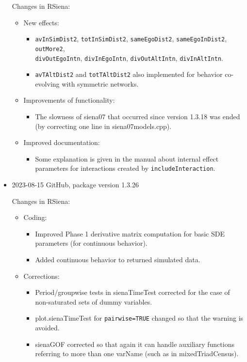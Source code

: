 \documentclass[a4paper,fleqn,11pt]{article}
\newcommand{\+}{\, + \,}
\newcommand{\sfn}[1]{\textsf{#1}}
\begin{document}
\begin{small}
\begin{itemize}
Changes in RSiena:
\begin{itemize}
\item New effects:
   \begin{itemize}
  \item \texttt{avInSimDist2}, \texttt{totInSimDist2}, \texttt{sameEgoDist2},
     \texttt{sameEgoInDist2},     \texttt{outMore2},\\
      \texttt{divOutEgoIntn}, \texttt{divInEgoIntn}, \texttt{divOutAltIntn},
    \texttt{divInAltIntn}.
  \item \texttt{avTAltDist2} and \texttt{totTAltDist2} also implemented for behavior co-evolving
    with symmetric networks.
    \end{itemize}
\item Improvements of functionality:
   \begin{itemize}
  \item The slowness of \sfn{siena07} that occurred since version 1.3.18
    was ended (by correcting one line in \sfn{siena07models.cpp}).
    \end{itemize}
\item Improved documentation:
   \begin{itemize}
  \item Some explanation is given in the manual about internal effect parameters
    for interactions created by \texttt{includeInteraction}.
    \end{itemize}
\end{itemize}

\item 2023-08-15 GitHub, package version 1.3.26

Changes in RSiena:
\begin{itemize}
\item Coding:
   \begin{itemize}
    \item Improved Phase 1 derivative matrix computation for basic SDE parameters
      (for continuous behavior).
    \item Added continuous behavior to returned simulated data.
    \end{itemize}
\item Corrections:
   \begin{itemize}
  \item Period/groupwise tests in \sfn{sienaTimeTest} corrected for the case of
    non-saturated sets of dummy variables.
  \item \sfn{plot.sienaTimeTest} for \texttt{pairwise=TRUE} changed so that the warning
    is avoided.
  \item \sfn{sienaGOF} corrected so that again it can handle auxiliary functions
    referring to more than one \sfn{varName} (such as in \sfn{mixedTriadCensus}).
    \end{itemize}
\end{itemize}



\end{itemize}
\end{small}
\end{document}
